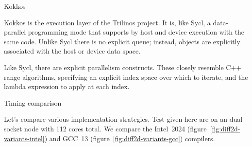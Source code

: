  {Kokkos}

Kokkos is the execution layer of the Trilinos project.
It is, like Sycl, a data-parallel programming mode
that supports by host and device execution with the same code.
Unlike Sycl there is no explicit queue; instead,
objects are explicitly associated with the host or device data space.


Like Sycl, there are explicit parallelism constructs.
These closely resemble C++ range algorithms,
specifying an explicit index space over which to iterate,
and the lambda expression to apply at each index.


 {Timing comparison}

Let's compare various implementation strategies.
Test given here are on an 
dual socket node with 112 cores total.
We compare the Intel~2024 (figure~\ref{fig:diff2d-variants-intel})
and GCC~13 (figure~\ref{fig:diff2d-variants-gcc})
compilers.

